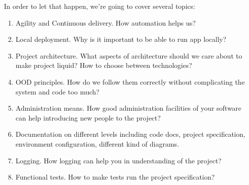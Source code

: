 \documentclass[11pt,a4paper,oneside]{article}
\begin{document}
In order to let that happen, we're going to cover several topics:
\begin{enumerate}
 \item Agility and Continuous delivery. How automation helps us?
 \item Local deployment. Why is it important to be able to run app locally?
 \item Project architecture. What aspects of architecture should we care about to make project liquid? How to choose between technologies?
 \item OOD principles. How do we follow them correctly without complicating the system and code too much?
 \item Administration means. How good administration facilities of your software can help introducing new people to the project?
 \item Documentation on different levels including code docs, project specification, environment configuration, different kind of diagrams.
 \item Logging. How logging can help you in understanding of the project?
 \item Functional tests. How to make tests run the project specification?
\end{enumerate}
\end{document}
